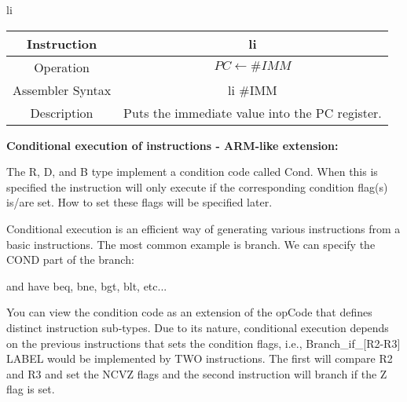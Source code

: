 \documentclass[]{article}
\begin{document}
li\\
\begin{tabularx}{\textwidth}{c|c}\hline
	Instruction & li\\\hline
	Operation & $PC \leftarrow \#IMM$\\\hline
	Assembler Syntax & li \#IMM\\\hline
	Description & Puts the immediate value into the PC register.\\\hline
\end{tabularx}\vspace{1.5cm}



\pagebreak

{\Large
	\textbf{
		Conditional execution of instructions - ARM-like extension:
	}
}

\noindent The R, D, and B type implement a condition code called Cond.  When this is specified the instruction will only execute if the corresponding condition flag(s) is/are set.  How to set these flags will be specified later.

\noindent Conditional execution is an efficient way of generating various instructions from a basic instructions.  The most common example is branch.  We can specify the COND part of the branch:


\noindent and have beq, bne, bgt, blt, etc...

\noindent You can view the condition code as an extension of the opCode that defines distinct instruction sub-types.  Due to its nature, conditional execution depends on the previous instructions that sets the condition flags, i.e., Branch\_if\_[R2-R3] LABEL would be implemented by TWO instructions.  The first will compare R2 and R3 and set the NCVZ flags and the second instruction will branch if the Z flag is set.
\end{document}
